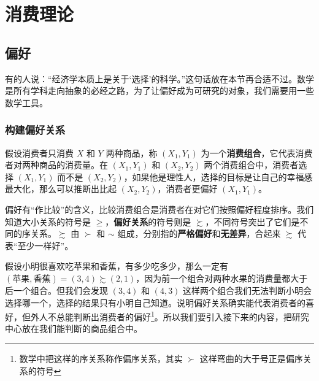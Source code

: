 \chapter{消费理论}
\setlength{\parskip}{0.5\baselineskip}

\section{偏好}

有的人说：“经济学本质上是关于‘选择’的科学。”这句话放在本节再合适不过。数学是所有学科走向抽象的必经之路，为了让偏好成为可研究的对象，我们需要用一些数学工具。

\subsection{构建偏好关系}

假设消费者只消费 $X$ 和 $Y$ 两种商品，称 $\left(X_1,Y_1\right)$ 为一个\textbf{消费组合}，它代表消费者对两种商品的消费量。在 $\left(X_1,Y_1\right)$ 和 $\left(X_2,Y_2\right)$ 两个消费组合中，消费者选择 $\left(X_1,Y_1\right)$ 而不是 $\left(X_2,Y_2\right)$，如果他是理性人，选择的目标是让自己的幸福感最大化，那么可以推断出比起 $\left(X_2,Y_2\right)$，消费者更偏好 $\left(X_1,Y_1\right)$。

偏好有“作比较”的含义，比较消费组合是消费者在对它们按照偏好程度排序。我们知道大小关系的符号是 $\ge$，\textbf{偏好关系}的符号则是 $\succsim$，不同符号突出了它们是不同的序关系。$\succsim$ 由 $\succ$ 和 $\sim$ 组成，分别指的\textbf{严格偏好}和\textbf{无差异}，合起来 $\succsim$ 代表“至少一样好”。

假设小明很喜欢吃苹果和香蕉，有多少吃多少，那么一定有 $(\text{苹果},\text{香蕉})=\left(3,4\right)\succsim\left(2,1\right)$，因为前一个组合对两种水果的消费量都大于后一个组合。但我们会发现 $\left(3,4\right)$ 和 $\left(4,3\right)$ 这样两个组合我们无法判断小明会选择哪一个，选择的结果只有小明自己知道。说明偏好关系确实能代表消费者的喜好，但外人不总能判断出消费者的偏好\footnote{数学中把这样的序关系称作偏序关系，其实 $\succ$ 这样弯曲的大于号正是偏序关系的符号}。所以我们要引入接下来的内容，把研究中心放在我们能判断的商品组合中。
